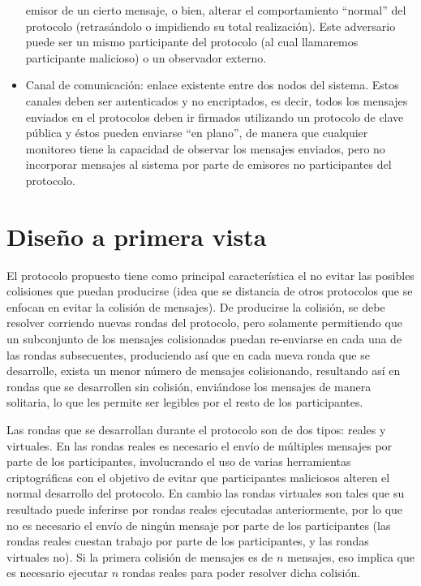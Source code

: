 \begin{itemize}
    emisor de un cierto mensaje, o bien, alterar el comportamiento ``normal'' 
    del protocolo (retrasándolo o impidiendo su total realización). Este 
    adversario puede ser un mismo participante del protocolo (al cual 
    llamaremos participante malicioso) o un observador externo.
    \item Canal de comunicación: enlace existente entre dos nodos del 
    sistema. Estos canales deben ser autenticados y no encriptados, es decir, todos los mensajes 
    enviados en el protocolos deben ir firmados utilizando un protocolo 
    de clave pública y éstos pueden enviarse ``en plano'', de manera que cualquier 
    monitoreo tiene la capacidad de observar los mensajes enviados, pero no 
    incorporar mensajes al sistema por parte de emisores no participantes del 
    protocolo.
\end{itemize}

\section{Diseño a primera vista}

El protocolo propuesto tiene como principal característica el no evitar las 
posibles colisiones que puedan producirse (idea que se distancia de otros protocolos 
que se enfocan en evitar la colisión de mensajes). De producirse la colisión, se 
debe resolver corriendo nuevas rondas del protocolo, pero solamente permitiendo 
que un subconjunto de los mensajes colisionados puedan re-enviarse en cada una 
de las rondas subsecuentes, produciendo así que en cada nueva ronda que se 
desarrolle, exista un menor número de mensajes colisionando, resultando así 
en rondas que se desarrollen sin colisión, enviándose los mensajes de manera 
solitaria, lo que les permite ser legibles por el resto de los participantes.

Las rondas que se desarrollan durante el protocolo son de dos tipos: reales y virtuales. 
En las rondas reales es necesario el envío de múltiples mensajes por parte de los participantes, 
involucrando el uso de varias herramientas criptográficas con el objetivo 
de evitar que participantes maliciosos alteren el normal desarrollo del protocolo. En cambio 
las rondas virtuales son tales que su resultado puede inferirse por rondas 
reales ejecutadas anteriormente, por lo que no es necesario el envío de 
ningún mensaje por parte de los participantes (las rondas reales cuestan trabajo por 
parte de los participantes, y las rondas virtuales no). Si la primera colisión 
de mensajes es de $n$ mensajes, eso implica que es necesario ejecutar $n$ rondas 
reales para poder resolver dicha colisión. 

